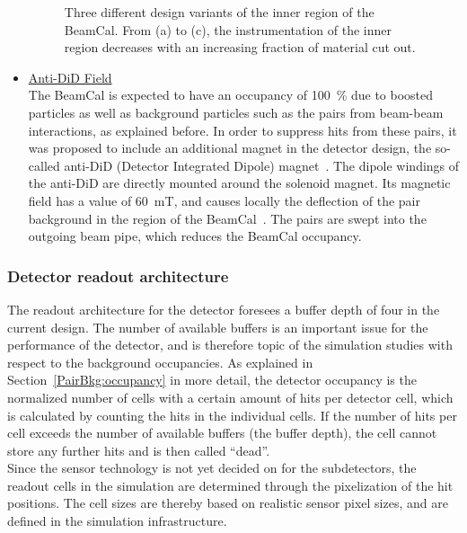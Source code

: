 \begin{itemize}
\begin{figure}
   \caption[Design variants of the \sid BeamCal]{Three different design variants of the inner region of the \sid BeamCal.
   From (a) to (c), the instrumentation of the inner region decreases with an increasing fraction of material cut out.}
   \label{fig:BeamCal}
 \end{figure}
 \item \underline{Anti-DiD Field}\\
 The BeamCal is expected to have an occupancy of \SI{100}{\percent} due to boosted particles as well as background particles such as the \positron\electron pairs from beam-beam interactions, as explained before.
 In order to suppress hits from these \positron\electron pairs, it was proposed to include an additional magnet in the detector design, the so-called anti-DiD (Detector Integrated Dipole) magnet~\cite{antiDiD}.
 The dipole windings of the anti-DiD are directly mounted around the \sid solenoid magnet.
 Its magnetic field has a value of \SI{60}{\milli\tesla}, and causes locally the deflection of the pair background in the region of the BeamCal~\cite[p. 118]{TDR4}.
 The pairs are swept into the outgoing beam pipe, which reduces the BeamCal occupancy.
\end{itemize}

\subsubsection{Detector readout architecture}
\label{ILC:SiD:readout}
The readout architecture for the \sid detector foresees a buffer depth of four in the current design.
The number of available buffers is an important issue for the performance of the detector, and is therefore topic of the \sid simulation studies with respect to the background occupancies.
As explained in Section~\ref{PairBkg:occupancy} in more detail, the detector occupancy is the  normalized number of cells with a certain amount of hits per detector cell, which is calculated by counting the hits in the individual cells.
If the number of hits per cell exceeds the number of available buffers (the buffer depth), the cell cannot store any further hits and is then called ``dead''.
\\Since the sensor technology is not yet decided on for the \sid subdetectors, the readout cells in the simulation are determined through the pixelization of the hit positions.
The cell sizes are thereby based on realistic sensor pixel sizes, and are defined in the \sid simulation infrastructure. 

